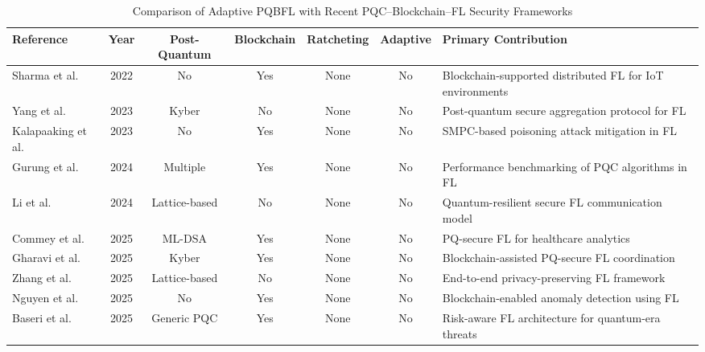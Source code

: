 \documentclass[journal, 10pt, twocolumn]{IEEEtran}
\begin{document}
\begin{table}[htbp]
\centering
\caption{Comparison of Adaptive PQBFL with Recent PQC–Blockchain–FL Security Frameworks}
\label{tab:lit_survey}

\footnotesize
\renewcommand{\arraystretch}{1.2}

\begin{tabularx}{\textwidth}{l c c c c c X}
\toprule
\textbf{Reference} & \textbf{Year} & \textbf{Post-Quantum} & \textbf{Blockchain} & \textbf{Ratcheting} & \textbf{Adaptive} & \textbf{Primary Contribution} \\
\midrule

Sharma et al. \cite{sharma2022}
& 2022 & No & Yes & None & No
& Blockchain-supported distributed FL for IoT environments \\

Yang et al. \cite{yang2023_secureagg}
& 2023 & Kyber & No & None & No
& Post-quantum secure aggregation protocol for FL \\

Kalapaaking et al. \cite{kalapaaking2023}
& 2023 & No & Yes & None & No
& SMPC-based poisoning attack mitigation in FL \\

Gurung et al. \cite{gurung2024}
& 2024 & Multiple & Yes & None & No
& Performance benchmarking of PQC algorithms in FL \\

Li et al. \cite{li2024}
& 2024 & Lattice-based & No & None & No
& Quantum-resilient secure FL communication model \\

Commey et al. \cite{pqsbfl}
& 2025 & ML-DSA & Yes & None & No
& PQ-secure FL for healthcare analytics \\

Gharavi et al. \cite{gharavi2025}
& 2025 & Kyber & Yes & None & No
& Blockchain-assisted PQ-secure FL coordination \\

Zhang et al. \cite{zhang2025}
& 2025 & Lattice-based & No & None & No
& End-to-end privacy-preserving FL framework \\

Nguyen et al. \cite{nguyen2025}
& 2025 & No & Yes & None & No
& Blockchain-enabled anomaly detection using FL \\

Baseri et al. \cite{baseri2025}
& 2025 & Generic PQC & Yes & None & No
& Risk-aware FL architecture for quantum-era threats \\


\end{tabularx}
\end{table}
\end{document}
